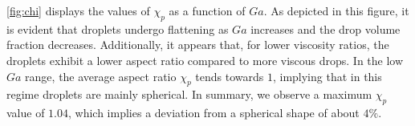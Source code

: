 \ref{fig:chi} displays the values of $\chi_p$ as a function of $Ga$.
As depicted in this figure, it is evident that droplets undergo flattening as $Ga$ increases and the drop volume fraction decreases. 
Additionally, it appears that, for lower viscosity ratios, the droplets exhibit a lower aspect ratio compared to more viscous drops.
In the low $Ga$ range, the average aspect ratio $\chi_p$ tends towards $1$, implying that in this regime droplets are mainly spherical. 
In summary, we observe a maximum $\chi_p$ value of $1.04$, which implies a deviation from a spherical shape of about $4\%$.



